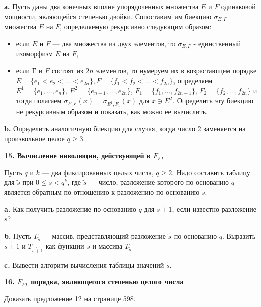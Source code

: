 \documentclass{mai_book}
\begin{document}
\bigskip


\bigskip

{\bf а.} Пусть даны два конечных вполне упорядоченных множества $E$ и $F$ одинаковой мощности, являющейся степенью двойки. Сопоставим им биекцию $\sigma_{E,F}$ множества $E$ на $F$, определяемую рекурсивно следующим образом:

\begin{itemize}
\item{если $E$ и $F$ — два множества из двух элементов, то $\sigma_{E,F}$ - единственный изоморфизм $E$ на $F$,}
\newpage

\item{если $Е$ и $F$ состоят из 2$n$ элементов, то нумеруем их в возрастающем порядке $E = \{e_{1} < e_{2} < \dots < e_{2n}\}, F = \{f_{1} < f_{2} < \dots < f_{2n}\}$, определяем $E^{1} = \{e_{1}, \dots ,e_{n}\}$, $E^{2} = \{e_{n+1}, \dots ,e_{2n}\}$, $F_{1} = \{f_{1}, \dots ,f_{2n-1}\}$, $F_{2} = \{f_{2}, \dots ,f_{2n}\}$ и тогда полагаем $\sigma_{E,F}(x) = \sigma_{E^{1},F_{1}}(x)$ для $x \ni E^{2}$. Определить
эту биекцию не рекурсивным образом и показать, как можно ее
вычислить.}
\end{itemize}

\textbf{b.} Определить аналогичную биекцию для случая, когда число 2 
заменяется на произвольное целое $q \geqslant 3$.

\medskip
\noindent
\textbf{15. Вычисление инволюции, действующей в $F_{FT}$}

\medskip
Пусть $q$ и $k$ --- два фиксированных целых числа, $q \geqslant 2$. Надо составить таблицу для $\widetilde{s}$ при $0 \leqslant s < q^{k}$, где $\widetilde{s}$ ---  число, разложение которого по основанию $q$ является обратным по отношению к разложению по основанию $s$.

\textbf{a.} Как получить разложение по основанию $q$ для $\widetilde{s+1}$, если известно разложение $s$?

\textbf{b.} Пусть $T_{\widetilde{s}}$ --- массив, представляющий разложение $\widetilde{s}$ по основанию $q$. Выразить $\widetilde{s+1}$ и $T_{\widetilde{s+1}}$ как функции $\widetilde{s}$ и массива $T_{\widetilde{s}}$

\textbf{c.} Вывести алгоритм вычисления таблицы значений $\widetilde{s}$.

\medskip
\noindent
\textbf{16. $F_{FT}$ порядка, являющегося степенью целого числа}

\medskip
Доказать предложение 12 на странице 598.
\end{document}
